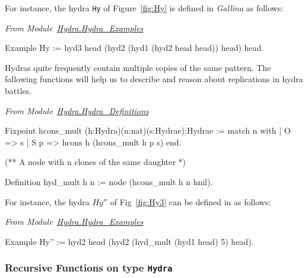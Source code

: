For instance, the hydra \texttt{Hy}  of Figure~\vref{fig:Hy} is defined in \emph{Gallina} as follows:

\vspace{4mm}
\noindent
\emph{From Module~\href{../theories/html/hydras.Hydra.Hydra_Examples.html\#Hy}{Hydra.Hydra\_Examples}}

\begin{Coqsrc}
Example Hy := hyd3 head
                   (hyd2
                      (hyd1 
                         (hyd2 head head))
                      head) 
                   head.
\end{Coqsrc}



Hydras quite frequently contain  multiple  copies of the same pattern. The following functions
will help us to describe and reason about replications in hydra battles.

\vspace{4pt}
\noindent
\emph{From Module~\href{../theories/html/hydras.Hydra.Hydra_Definitions.html\#hcons_mult}{Hydra.Hydra\_Definitions}}

\begin{Coqsrc}
Fixpoint hcons_mult (h:Hydra)(n:nat)(s:Hydrae):Hydrae :=
  match n with 
  | O => s
  | S p => hcons h (hcons_mult h p s)
  end.

(** A node with n clones of the same daughter *)

Definition hyd_mult h n :=
  node (hcons_mult h n hnil).
\end{Coqsrc}

\vspace{4mm}



For instance, the hydra $Hy''$ of Fig~\vref{fig:Hy3}  can be defined in \coq{} as follows:

\vspace{4pt}
\noindent
\emph{From Module~\href{../theories/html/hydras.Hydra.Hydra_Examples.html}{Hydra.Hydra\_Examples}}

\begin{Coqsrc}
Example Hy'' := 
     hyd2 head
          (hyd2 (hyd_mult (hyd1 head) 5)
                head).
\end{Coqsrc}




\subsubsection{Recursive Functions on type \texttt{Hydra}}
\label{sec:orgheadline41}
\label{sec:hsize-def}




